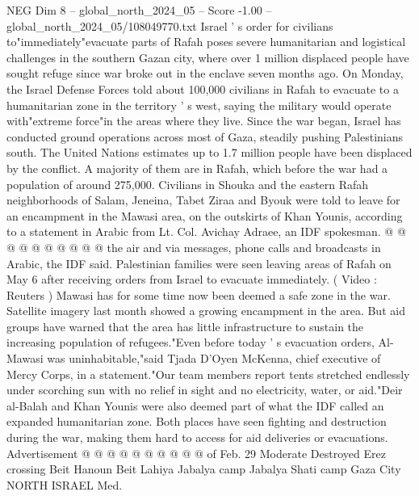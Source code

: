 \begin{textsample}{NEG Dim 8 – global\_north\_2024\_05 – Score -1.00 – global\_north\_2024\_05/108049770.txt}  \label{ex:f8_neg_380}
Israel ' s order for civilians to"immediately"evacuate parts of Rafah poses severe humanitarian and logistical challenges in the southern Gazan city, where over 1 million displaced people have sought refuge since war broke out in the enclave seven months ago.
On Monday, the Israel Defense Forces told about 100,000 civilians in Rafah to evacuate to a humanitarian zone in the territory ' s west, saying the military would operate with"extreme force"in the areas where they live.
Since the war began, Israel has conducted ground operations across most of Gaza, steadily pushing Palestinians south.
The United Nations estimates up to 1.7 million people have been displaced by the conflict.
A majority of them are in Rafah, which before the war had a population of around 275,000.
Civilians in Shouka and the eastern Rafah neighborhoods of Salam, Jeneina, Tabet Ziraa and Byouk were told to leave for an encampment in the Mawasi area, on the outskirts of Khan Younis, according to a statement in Arabic from Lt.
Col.
Avichay Adraee, an IDF spokesman. @ @ @ @ @ @ @ @ @ @ the air and via messages, phone calls and broadcasts in Arabic, the IDF said.
Palestinian families were seen leaving areas of Rafah on May 6 after receiving orders from Israel to evacuate immediately. ( Video : Reuters ) Mawasi has for some time now been deemed a safe zone in the war.
Satellite imagery last month showed a growing encampment in the area.
But aid groups have warned that the area has little infrastructure to sustain the increasing population of refugees."Even before today ' s evacuation orders, Al-Mawasi was uninhabitable,"said Tjada D'Oyen McKenna, chief executive of Mercy Corps, in a statement."Our team members report tents stretched endlessly under scorching sun with no relief in sight and no electricity, water, or aid."Deir al-Balah and Khan Younis were also deemed part of what the IDF called an expanded humanitarian zone.
Both places have seen fighting and destruction during the war, making them hard to access for aid deliveries or evacuations.
Advertisement @ @ @ @ @ @ @ @ @ @ of Feb. 29 Moderate Destroyed Erez crossing Beit Hanoun Beit Lahiya Jabalya camp Jabalya Shati camp Gaza City NORTH ISRAEL Med.

\end{textsample}
